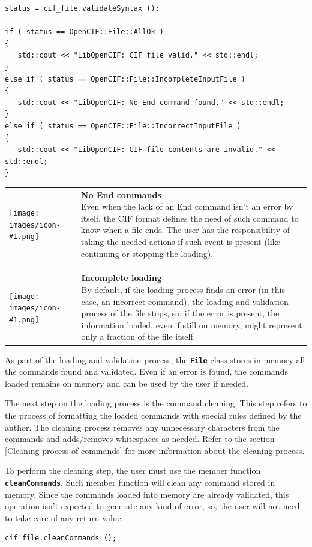 \documentclass[11pt,twoside,openany,x11names,svgnames]{memoir}
\makeatletter
\newcommand{\IconNote}[3]
{
	\begin{table}[ht]
	\begin{tabular}{ lm{\dimexpr\textwidth-8\tabcolsep-\wd0}@{}}
		\toprule
		\texttt{[image: images/icon-\#1.png]}
		&
		\parbox[t]{155mm}{
		\textbf{#2} \\
		#3
		}
	\end{tabular}
\end{table}
}
\makeatother
\begin{document}
\begin{lstlisting}[frame=single,style=CPPStyle]
status = cif_file.validateSyntax ();
   
if ( status == OpenCIF::File::AllOk )
{
   std::cout << "LibOpenCIF: CIF file valid." << std::endl;
}
else if ( status == OpenCIF::File::IncompleteInputFile )
{
   std::cout << "LibOpenCIF: No End command found." << std::endl;
}
else if ( status == OpenCIF::File::IncorrectInputFile )
{
   std::cout << "LibOpenCIF: CIF file contents are invalid." << std::endl;
}
\end{lstlisting}

\IconNote
	{warning}
	{No End commands}
	{Even when the lack of an End command isn't an error by itself, the CIF format defines the need of such command to know when a file ends. The user has the responsibility of taking the needed actions if such event is present (like continuing or stopping the loading).}
	
\IconNote
	{warning}
	{Incomplete loading}
	{By default, if the loading process finds an error (in this case, an incorrect command), the loading and validation process of the file stops, so, if the error is present, the information loaded, even if still on memory, might represent only a fraction of the file itself.}
	
As part of the loading and validation process, the \textbf{\texttt{File}} class stores in memory all the commands found and validated. Even if an error is found, the commands loaded remains on memory and can be used by the user if needed.

The next step on the loading process is the command cleaning. This step refers to the process of formatting the loaded commands with special rules defined by the author. The cleaning process removes any unnecessary characters from the commands and adds/removes whitespaces as needed. Refer to the section \ref{Cleaning-process-of-commands} for more information about the cleaning process.

To perform the cleaning step, the user must use the member function \textbf{\texttt{cleanCommands}}. Such member function will clean any command stored in memory. Since the commands loaded into memory are already validated, this operation isn't expected to generate any kind of error, so, the user will not need to take care of any return value:

\begin{lstlisting}[frame=single,style=CPPStyle]
cif_file.cleanCommands ();
\end{lstlisting}
\end{document}
